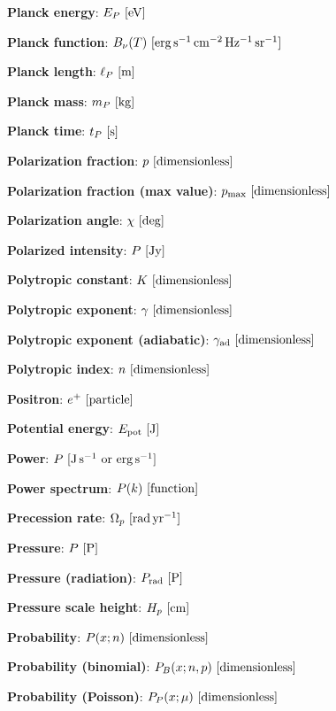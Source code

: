 \documentclass[a4paper,10pt]{article}
\begin{document}
{\noindent}\textbf{Planck energy}: $E_P ~ [{\rm eV}]$

{\noindent}\textbf{Planck function}: $B_\nu(T) ~ [{\rm erg\,s^{-1}\,cm^{-2}\,Hz^{-1}\,sr^{-1}}]$

{\noindent}\textbf{Planck length}: $\ell_P ~ [{\rm m}]$

{\noindent}\textbf{Planck mass}: $m_P ~ [{\rm kg}]$

{\noindent}\textbf{Planck time}: $t_P ~ [{\rm s}]$

{\noindent}\textbf{Polarization fraction}: $p ~ [{\rm dimensionless}]$

{\noindent}\textbf{Polarization fraction (max value)}: $p_\mathrm{max} ~ [{\rm dimensionless}]$

{\noindent}\textbf{Polarization angle}: $\chi ~ [{\rm deg}]$

{\noindent}\textbf{Polarized intensity}: $P ~ [{\rm Jy}]$

{\noindent}\textbf{Polytropic constant}: $K ~ [{\rm dimensionless}]$

{\noindent}\textbf{Polytropic exponent}: $\gamma ~ [{\rm dimensionless}]$

{\noindent}\textbf{Polytropic exponent (adiabatic)}: $\gamma_{\rm ad} ~ [{\rm dimensionless}]$

{\noindent}\textbf{Polytropic index}: $n ~ [{\rm dimensionless}]$

{\noindent}\textbf{Positron}: $e^+ ~ [{\rm particle}]$

{\noindent}\textbf{Potential energy}: $E_\mathrm{pot} ~ [{\rm J}]$

{\noindent}\textbf{Power}: $P ~ [{\rm J\,s^{-1}~{\rm or}~{\rm erg\,s^{-1}}}]$

{\noindent}\textbf{Power spectrum}: $P(k) ~ [{\rm function}]$

{\noindent}\textbf{Precession rate}: $\Omega_p ~ [{\rm rad\,yr^{-1}}]$

{\noindent}\textbf{Pressure}: $P ~ [{\rm P}]$

{\noindent}\textbf{Pressure (radiation)}: $P_{\rm rad} ~ [{\rm P}]$

{\noindent}\textbf{Pressure scale height}: $H_p ~ [{\rm cm}]$

{\noindent}\textbf{Probability}: $P(x;n) ~ [{\rm dimensionless}]$

{\noindent}\textbf{Probability (binomial)}: $P_B(x;n,p) ~ [{\rm dimensionless}]$

{\noindent}\textbf{Probability (Poisson)}: $P_P(x;\mu) ~ [{\rm dimensionless}]$
\end{document}

